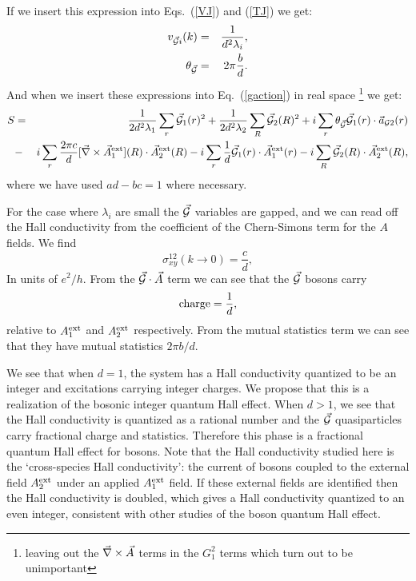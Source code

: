 If we insert this expression into Eqs.~(\ref{VJ}) and (\ref{TJ}) we get:
\begin{eqnarray}
v_{\vec{\mathcal{G}} i}(k)&=&\frac{1}{d^2\lambda_i},\label{vgd2} \\
\theta_{\vec{\mathcal{G}}}&=&2\pi\frac{b}{d}.\label{tg}
\end{eqnarray}
And when we insert these expressions into Eq.~(\ref{gaction}) in real space
\footnote{leaving out the $\vec{\nabla}\times\vec{A}$ terms in the $G_1^2$ terms which turn out to be unimportant}
we get:
\begin{eqnarray}
S&=&\frac{1}{2d^2\lambda_1}\sum_r \vec{\mathcal{G}}_1(r)^2
+\frac{1}{2d^2\lambda_2}\sum_R \vec{\mathcal{G}}_2(R)^2
+i\sum_r \theta_{\vec{\mathcal{G}}} \vec{\mathcal{G}}_1(r)\cdot \vec{a}_{{\cal G}2}(r)\\
&-&i\sum_r \frac{2\pi c}{d} [\vec{\nabla}\times\vec{A}_{1}^{\rm ext}](R)\cdot \vec{A}_{2}^{\rm ext}(R)\nonumber
- i\sum_r \frac{1}{d} \vec{\mathcal{G}}_1(r) \cdot \vec{A}_{1}^{\rm ext}(r) -i\sum_R\vec{\mathcal{G}}_2(R) \cdot \vec{A}_{2}^{\rm ext}(R),
\label{gaction}
\end{eqnarray}
where we have used $ad-bc=1$ where necessary. 

For the case where $\lambda_i$ are small the $\vec{\mathcal{G}}$ variables are gapped, and we can read off the Hall conductivity from the coefficient of the Chern-Simons term for the $A$ fields. We find
\begin{equation}
\sigma_{xy}^{12}(k\rightarrow0)=\frac{c}{d},
\label{sigma}
\end{equation}
In units of $e^2/h$. From the $\vec{\mathcal{G}}\cdot\vec{A}$ term we can see that the $\vec{\mathcal{G}}$ bosons carry 
\begin{equation}
{\rm charge} = \frac{1}{d}, \label{charge1d}
\end{equation}
relative to $A^{\rm ext}_1$ and $A^{\rm ext}_2$ respectively.
From the mutual statistics term we can see that they have mutual statistics $2\pi b/d$. 

We see that when $d=1$, the system has a Hall conductivity quantized to be an integer and excitations carrying integer charges. We propose that this is a realization of the bosonic integer quantum Hall effect.\cite{LuVishwanath2012}  When $d>1$, we see that the Hall conductivity is quantized as a rational number and the $\vec{\mathcal{G}}$ quasiparticles carry fractional charge and statistics. Therefore this phase is a fractional quantum Hall effect for bosons. Note that the Hall conductivity studied here is the `cross-species Hall conductivity': the current of bosons coupled to the external field $A^{\rm ext}_2$ under an applied $A^{\rm ext}_1$ field. If these external fields are identified then the Hall conductivity is doubled, which gives a Hall conductivity quantized to an even integer, consistent with other studies of the boson quantum Hall effect.


